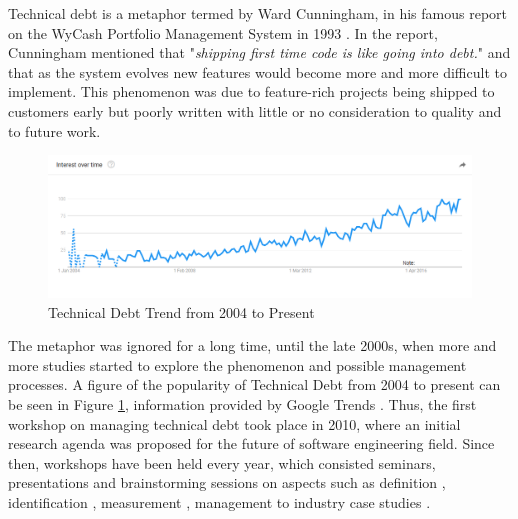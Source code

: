 \documentclass{mprop}
\begin{document}
Technical debt is a metaphor termed by Ward Cunningham, in his famous report on the WyCash Portfolio Management System in 1993 \cite{Cunningham1993}.
In the report, Cunningham mentioned that "\textit{shipping first time code is like going into debt.}" and that as the system evolves new features would become more and more difficult to implement.
This phenomenon was due to feature-rich projects being shipped to customers early but poorly written with little or no consideration to quality and to future work.

\begin{figure}
	\centering
	\includegraphics[width=\linewidth]{visualisations/TD_trend.png}
	\caption{Technical Debt Trend from 2004 to Present}
	\label{fig:td-trend}
\end{figure}

The metaphor was ignored for a long time, until the late 2000s, when more and more studies started to explore the phenomenon and possible management processes.
A figure of the popularity of Technical Debt from 2004 to present can be seen in Figure \ref{fig:td-trend}, information provided by Google Trends \cite{GoogleTrends}.
Thus, the first workshop on managing technical debt took place in 2010, where an initial research agenda was proposed for the future of software engineering field.
Since then, workshops have been held every year, which consisted seminars, presentations and brainstorming sessions on aspects such as
definition \cite{Kruchten2012} \cite{Theodoropoulos2011} \cite{Schmid2013},
identification \cite{Ernst2012},
measurement \cite{Letouzey2012} \cite{Curtis2012} \cite{Nugroho2011} \cite{Zazworka2011} \cite{Fontana2012} \cite{Bohnet2011},
management \cite{Guo2011} \cite{Zazworka2011Prioritise} \cite{Seaman2012} to
industry case studies \cite{Lim2012} \cite{Morgenthaler2012} \cite{Codabux2013} \cite{Holvitie2014} \cite{Klinger2011}.
\end{document}

